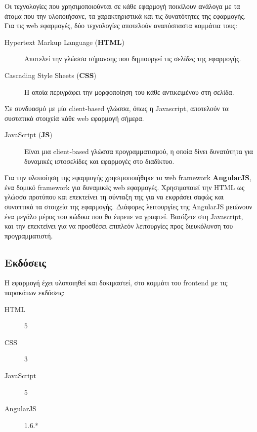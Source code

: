 Οι τεχνολογίες που χρησιμοποιούνται σε κάθε εφαρμογή ποικίλουν ανάλογα με τα άτομα που την υλοποιήσανε, τα χαρακτηριστικά και τις δυνατότητες της εφαρμογής.
\newline
Για τις web εφαρμογές, δύο τεχνολογίες αποτελούν αναπόσπαστα κομμάτια τους:

\begin{description}
\item [Hypertext Markup Language (\textbf{HTML})] Αποτελεί την γλώσσα σήμανσης που δημιουργεί τις σελίδες της εφαρμογής.

\item [Cascading Style Sheets (\textbf{CSS})] Η οποία περιγράφει την μορφοποίηση του κάθε αντικειμένου στη σελίδα. 
\end{description}


Σε συνδυασμό με μία client-based γλώσσα, όπως η Javascript, αποτελούν τα συστατικά στοιχεία κάθε web εφαρμογή σήμερα.

\begin{description}
\item [JavaScript (\textbf{JS})] Είναι μια client-based γλώσσα προγραμματισμού, η οποία δίνει δυνατότητα για δυναμικές ιστοσελίδες και εφαρμογές στο διαδίκτυο.
\end{description}

Για την υλοποίηση της εφαρμογής χρησιμοποιήθηκε το web framework \textbf{AngularJS}, ένα δομικό framework για δυναμικές web εφαρμογές. Χρησιμοποιεί την HTML ως γλώσσα προτύπου και επεκτείνει τη σύνταξη της για να εκφράσει σαφώς και συνοπτικά τα στοιχεία της εφαρμογής. Διάφορες  λειτουργίες της AngularJS μειώνουν ένα μεγάλο μέρος του κώδικα που θα έπρεπε να γραφτεί. Βασίζετε στη Javascript, και την επεκτείνει για να προσθέσει επιπλεόν λειτουργίες προς διευκόλυνση του προγραμματιστή.

\subsection{Εκδόσεις}

Η εφαρμογή έχει υλοποιηθεί και δοκιμαστεί, στο κομμάτι του frontend με τις παρακάτων εκδόσεις:

\begin{description}
\item [HTML] 5
\item [CSS] 3
\item [JavaScript] 5
\item [AngularJS] 1.6.*
\end{description}


